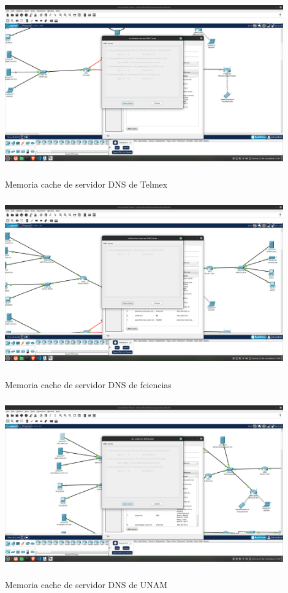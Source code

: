\documentclass[14pt]{book}
\begin{document}
\includegraphics[width=12cm, height=8cm]{images/cache dns telmex.png} Memoria cache de servidor DNS de Telmex\\


\includegraphics[width=12cm, height=8cm]{images/cache dns ciencias.png} Memoria cache de servidor DNS de fciencias\\


\includegraphics[width=12cm, height=8cm]{images/cache dns unam.png} Memoria cache de servidor DNS de UNAM\\
\end{document}
